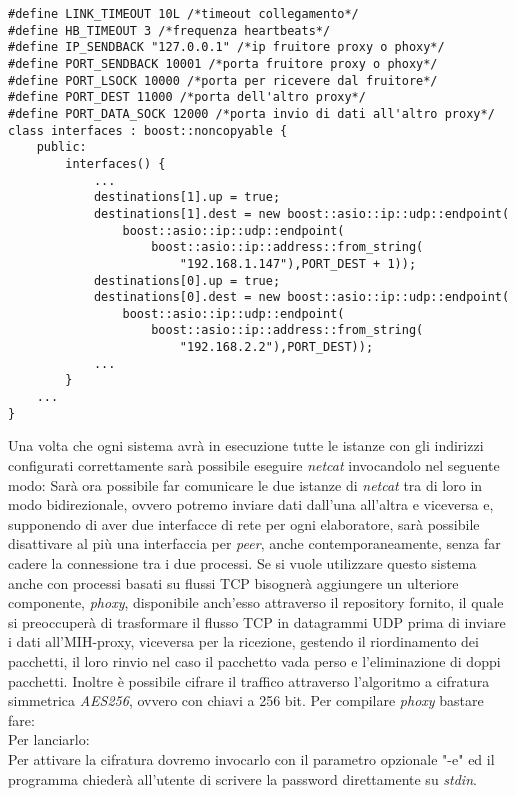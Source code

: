 \begin{verbatim}
#define LINK_TIMEOUT 10L /*timeout collegamento*/
#define HB_TIMEOUT 3 /*frequenza heartbeats*/
#define IP_SENDBACK "127.0.0.1" /*ip fruitore proxy o phoxy*/
#define PORT_SENDBACK 10001 /*porta fruitore proxy o phoxy*/
#define PORT_LSOCK 10000 /*porta per ricevere dal fruitore*/
#define PORT_DEST 11000 /*porta dell'altro proxy*/
#define PORT_DATA_SOCK 12000 /*porta invio di dati all'altro proxy*/
class interfaces : boost::noncopyable {
    public:
        interfaces() {
            ...
            destinations[1].up = true;
            destinations[1].dest = new boost::asio::ip::udp::endpoint(
                boost::asio::ip::udp::endpoint(
                    boost::asio::ip::address::from_string(
                        "192.168.1.147"),PORT_DEST + 1));
            destinations[0].up = true;
            destinations[0].dest = new boost::asio::ip::udp::endpoint(
                boost::asio::ip::udp::endpoint(
                    boost::asio::ip::address::from_string(
                        "192.168.2.2"),PORT_DEST));
            ...
        }
    ...
}
\end{verbatim}
Una volta che ogni sistema avrà in esecuzione tutte le istanze con gli indirizzi configurati correttamente sarà possibile eseguire {\em netcat} invocandolo nel seguente modo:
Sarà ora possibile far comunicare le due istanze di {\em netcat} tra di loro in modo bidirezionale, ovvero potremo inviare dati dall'una all'altra e viceversa e, supponendo di aver due interfacce di rete per ogni elaboratore, sarà possibile disattivare al più una interfaccia per {\em peer}, anche contemporaneamente, senza far cadere la connessione tra i due processi. Se si vuole utilizzare questo sistema anche con processi basati su flussi TCP bisognerà aggiungere un ulteriore componente, {\em phoxy}, disponibile anch'esso attraverso il repository fornito, il quale si preoccuperà di trasformare il flusso TCP in datagrammi UDP prima di inviare i dati all'MIH-proxy, viceversa per la ricezione, gestendo il riordinamento dei pacchetti, il loro rinvio nel caso il pacchetto vada perso e l'eliminazione di doppi pacchetti. Inoltre è possibile cifrare il traffico attraverso l'algoritmo a cifratura simmetrica {\em AES256}, ovvero con chiavi a 256 bit. Per compilare {\em phoxy} bastare fare:\\
Per lanciarlo:\\
Per attivare la cifratura dovremo invocarlo con il parametro opzionale "-e" ed il programma chiederà all'utente di scrivere la password direttamente su {\em stdin}.

